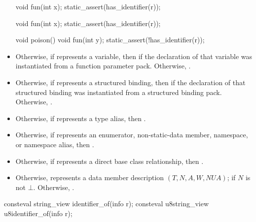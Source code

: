 \begin{itemdescr}
\begin{itemize}
\begin{example}
\begin{codeblock}
void fun(int x);
static_assert(has_identifier(r));

void fun(int x);
static_assert(has_identifier(r));

void poison() {
  void fun(int y);
}
static_assert(!has_identifier(r));
\end{codeblock}
  \end{example}
\item
  Otherwise, if  represents a variable,
  then  if the declaration of that variable
  was instantiated from a function parameter pack.
  Otherwise, .
\item
  Otherwise, if  represents a structured binding,
  then  if the declaration of that structured binding
  was instantiated from a structured binding pack.
  Otherwise, .
\item
  Otherwise, if  represents a type alias,
  then .
\item
  Otherwise, if  represents an
  enumerator,
  non-static-data member,
  namespace, or
  namespace alias,
  then .
\item
  Otherwise, if  represents a direct base class relationship,
  then .
\item
  Otherwise,  represents a data member description
  $(T, N, A, W, \mathit{NUA})$;
   if $N$ is not $\bot$.
  Otherwise, .
\end{itemize}
\end{itemdescr}

%
%
\begin{itemdecl}
consteval string_view identifier_of(info r);
consteval u8string_view u8identifier_of(info r);
\end{itemdecl}

